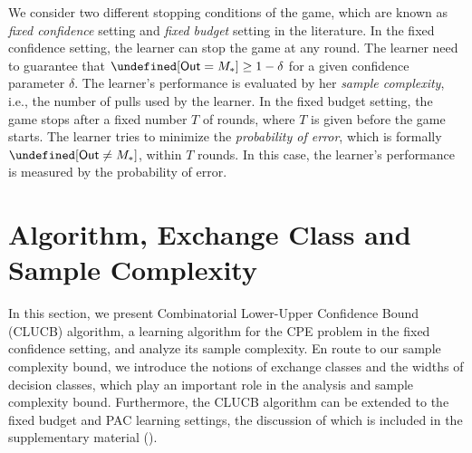 \documentclass{article}
\newcommand{\Algorithm}{{\small \textsf{CLUCB}}\xspace}
\newcommand{\Problem}{{CPE}\xspace}
\newcommand{\M}{\mathcal M}
\newcommand{\RR}{\mathbb R}
\newcommand{\out}{\mathsf{Out}}
\let\Pr\undefined
\DeclareMathOperator{\Pr}{Pr}
\newcommand{\MultiIdent}{\textsc{TopK}\xspace}
\newcommand{\MultiBandit}{\textsc{MB}\xspace}
\renewcommand{\vec}[1]{\boldsymbol{#1}}
\begin{document}
We consider two different stopping conditions of the game, which are known as \emph{fixed confidence} setting and \emph{fixed budget} setting in the literature.
In the fixed confidence setting, the learner can stop the game at any round. 
The learner need to guarantee that $\Pr[\out = M_*] \ge 1-\delta$ for a given confidence parameter $\delta$.
The learner's performance is evaluated by her \emph{sample complexity}, i.e., the number of pulls used by the learner.
In the fixed budget setting, the game stops after a fixed number $T$ of rounds, where $T$ is given before the game starts.
The learner tries to minimize the \emph{probability of error}, which is formally $\Pr[\out \not= M_*]$, within $T$ rounds.
In this case, the learner's performance is measured by the probability of error.





\vspace{-0.7em}
\section{Algorithm, Exchange Class and Sample Complexity}
\vspace{-0.7em}


In this section, we present Combinatorial Lower-Upper Confidence Bound (\Algorithm) algorithm, a learning algorithm for the \Problem problem in the fixed confidence setting, and analyze its sample complexity. 
En route to our sample complexity bound, we introduce the notions of exchange classes and the widths of decision classes, which play an important role in the analysis and sample complexity bound.
Furthermore, the \Algorithm algorithm can be extended to the fixed budget and PAC learning settings,
	the discussion of which is included in the supplementary material ().
\end{document}
